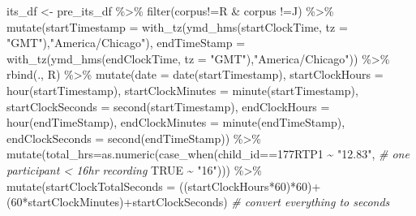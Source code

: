 \documentclass[
]{article}
\newenvironment{Shaded}{\begin{snugshade}}{\end{snugshade}}
\newcommand{\AttributeTok}[1]{\textcolor[rgb]{0.77,0.63,0.00}{#1}}
\newcommand{\CommentTok}[1]{\textcolor[rgb]{0.56,0.35,0.01}{\textit{#1}}}
\newcommand{\ConstantTok}[1]{\textcolor[rgb]{0.00,0.00,0.00}{#1}}
\newcommand{\DecValTok}[1]{\textcolor[rgb]{0.00,0.00,0.81}{#1}}
\newcommand{\FunctionTok}[1]{\textcolor[rgb]{0.00,0.00,0.00}{#1}}
\newcommand{\NormalTok}[1]{#1}
\newcommand{\OtherTok}[1]{\textcolor[rgb]{0.56,0.35,0.01}{#1}}
\newcommand{\SpecialCharTok}[1]{\textcolor[rgb]{0.00,0.00,0.00}{#1}}
\newcommand{\StringTok}[1]{\textcolor[rgb]{0.31,0.60,0.02}{#1}}
\begin{document}
\begin{Shaded}
\begin{Highlighting}[]
\NormalTok{its\_df }\OtherTok{\textless{}{-}}\NormalTok{ pre\_its\_df }\SpecialCharTok{\%\textgreater{}\%} 
  \FunctionTok{filter}\NormalTok{(corpus}\SpecialCharTok{!=}\StringTok{\textquotesingle{}R\textquotesingle{}} \SpecialCharTok{\&}\NormalTok{ corpus }\SpecialCharTok{!=}\StringTok{\textquotesingle{}J\textquotesingle{}}\NormalTok{) }\SpecialCharTok{\%\textgreater{}\%} 
  \FunctionTok{mutate}\NormalTok{(}\AttributeTok{startTimestamp =} \FunctionTok{with\_tz}\NormalTok{(}\FunctionTok{ymd\_hms}\NormalTok{(startClockTime, }\AttributeTok{tz =} \StringTok{"GMT"}\NormalTok{),}\StringTok{"America/Chicago"}\NormalTok{),}
         \AttributeTok{endTimeStamp =} \FunctionTok{with\_tz}\NormalTok{(}\FunctionTok{ymd\_hms}\NormalTok{(endClockTime, }\AttributeTok{tz =} \StringTok{"GMT"}\NormalTok{),}\StringTok{"America/Chicago"}\NormalTok{)) }\SpecialCharTok{\%\textgreater{}\%}  
  \FunctionTok{rbind}\NormalTok{(., R) }\SpecialCharTok{\%\textgreater{}\%} 
    \FunctionTok{mutate}\NormalTok{(}\AttributeTok{date =} \FunctionTok{date}\NormalTok{(startTimestamp),}
    \AttributeTok{startClockHours =} \FunctionTok{hour}\NormalTok{(startTimestamp),  }
    \AttributeTok{startClockMinutes =} \FunctionTok{minute}\NormalTok{(startTimestamp),}
    \AttributeTok{startClockSeconds =} \FunctionTok{second}\NormalTok{(startTimestamp),}
    \AttributeTok{endClockHours =} \FunctionTok{hour}\NormalTok{(endTimeStamp),  }
    \AttributeTok{endClockMinutes =} \FunctionTok{minute}\NormalTok{(endTimeStamp),}
    \AttributeTok{endClockSeconds =} \FunctionTok{second}\NormalTok{(endTimeStamp)) }\SpecialCharTok{\%\textgreater{}\%}
    \FunctionTok{mutate}\NormalTok{(}\AttributeTok{total\_hrs=}\FunctionTok{as.numeric}\NormalTok{(}\FunctionTok{case\_when}\NormalTok{(child\_id}\SpecialCharTok{==}\StringTok{\textquotesingle{}177RTP1\textquotesingle{}} \SpecialCharTok{\textasciitilde{}} \StringTok{"12.83"}\NormalTok{, }\CommentTok{\# one participant \textless{} 16hr recording }
                              \ConstantTok{TRUE} \SpecialCharTok{\textasciitilde{}} \StringTok{"16"}\NormalTok{))) }\SpecialCharTok{\%\textgreater{}\%}
    \FunctionTok{mutate}\NormalTok{(}\AttributeTok{startClockTotalSeconds =}\NormalTok{ ((startClockHours}\SpecialCharTok{*}\DecValTok{60}\NormalTok{)}\SpecialCharTok{*}\DecValTok{60}\NormalTok{)}\SpecialCharTok{+}\NormalTok{(}\DecValTok{60}\SpecialCharTok{*}\NormalTok{startClockMinutes)}\SpecialCharTok{+}\NormalTok{startClockSeconds) }\CommentTok{\# convert everything to seconds}


\end{Highlighting}
\end{Shaded}
\end{document}

